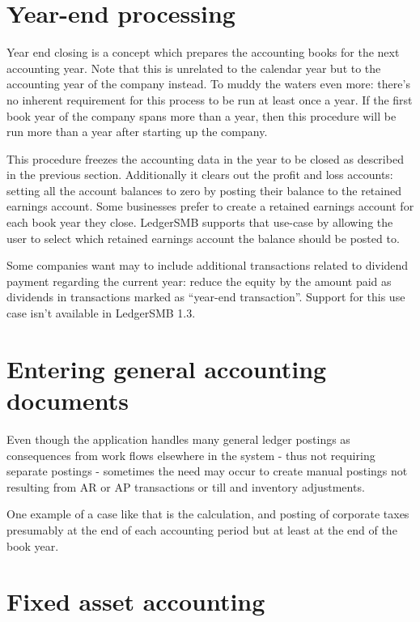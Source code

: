 \section{Year-end processing}
\label{sec:YearEndProcessing}

Year end closing is a concept which prepares the accounting books for the next
accounting year. Note that this is unrelated to the calendar year but to the
accounting year of the company instead. To muddy the waters even more: there's
no inherent requirement for this process to be run at least once a year. If the
first book year of the company spans more than a year, then this procedure will
be run more than a year after starting up the company.

This procedure freezes the accounting data in the year to be closed as described
in the previous section. Additionally it clears out the profit and loss accounts:
setting all the account
balances to zero by posting their balance to the retained earnings account. Some
businesses prefer to create a retained earnings account for each book year they
close. LedgerSMB supports that use-case by allowing the user to select which
retained earnings account the balance should be posted to.

Some companies want may to include additional transactions related to dividend
payment regarding the current year: reduce the equity by the amount paid as
dividends in transactions marked as ``year-end transaction''. Support
for this use case isn't available in LedgerSMB 1.3.


\section{Entering general accounting documents}

Even though the application handles many general ledger postings as consequences
from work flows elsewhere in the system - thus not requiring separate postings -
sometimes the need may occur to create manual postings not resulting from
AR or AP transactions or till and inventory adjustments.

One example of a case like that is the calculation, and posting of
corporate taxes presumably at the end of each accounting period but at least
at the end of the book year.


\section{Fixed asset accounting}
\label{sec:FixedAssetAccounting}


